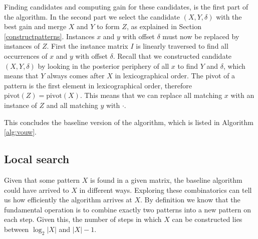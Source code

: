 \documentclass{llncs}
\begin{document}
Finding candidates and computing gain for these candidates, is the first part of the algorithm. In the second part we select the candidate $(X,Y,\delta)$ with the best gain and merge $X$ and $Y$ to form $Z$, as explained in Section \ref{constructpatterns}. Instances $x$ and $y$ with offset $\delta$ must now be replaced by instances of $Z$. First the instance matrix $I$ is linearly traversed to find all occurrences of $x$ and $y$ with offset $\delta$. Recall that we constructed candidate $(X,Y,\delta)$ by looking in the posterior periphery of all $x$ to find $Y$ and $\delta$, which means that $Y$ always comes after $X$ in lexicographical order. The pivot of a pattern is the first element in lexicographical order, therefore $\mathrm{pivot}(Z) = \mathrm{pivot}(X)$. This means that we can replace all matching $x$ with an instance of $Z$ and all matching $y$ with $\cdot$. 

This concludes the baseline version of the algorithm, which is listed in Algorithm \ref{alg:vouw}. 

\subsection{Local search}

Given that some pattern $X$ is found in a given matrix, the baseline algorithm could have arrived to $X$ in different ways. Exploring these combinatorics can tell us how efficiently the algorithm arrives at $X$. By definition we know that the fundamental operation is to combine exactly two patterns into a new pattern on each step. Given this, the number of steps in which $X$ can be constructed lies between $\log_2|X|$ and $|X|-1$. 

\end{document}
